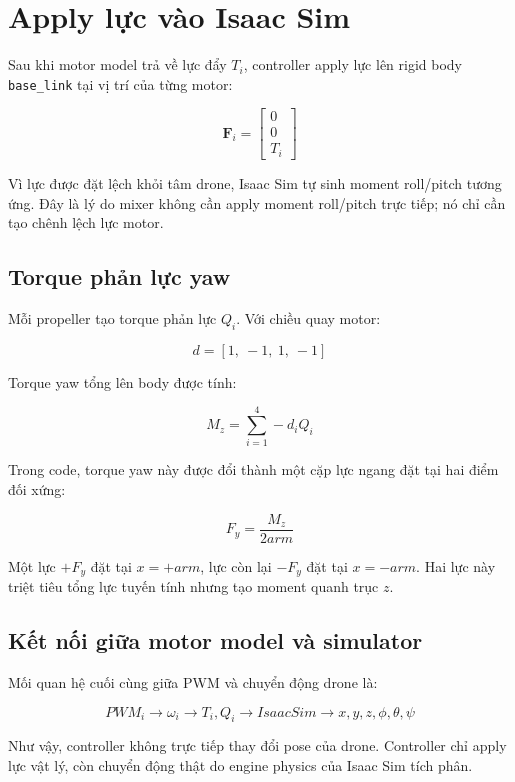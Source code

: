 \section{Apply lực vào Isaac Sim}

Sau khi motor model trả về lực đẩy $T_i$, controller apply lực lên rigid body
\texttt{base\_link} tại vị trí của từng motor:

\begin{equation}
    \mathbf{F}_i
    =
    \begin{bmatrix}
        0 \\
        0 \\
        T_i
    \end{bmatrix}
\end{equation}

Vì lực được đặt lệch khỏi tâm drone, Isaac Sim tự sinh moment roll/pitch tương
ứng. Đây là lý do mixer không cần apply moment roll/pitch trực tiếp; nó chỉ cần
tạo chênh lệch lực motor.

\subsection{Torque phản lực yaw}

Mỗi propeller tạo torque phản lực $Q_i$. Với chiều quay motor:

\begin{equation}
    d = [1,\ -1,\ 1,\ -1]
\end{equation}

Torque yaw tổng lên body được tính:

\begin{equation}
    M_z
    =
    \sum_{i=1}^{4} -d_iQ_i
\end{equation}

Trong code, torque yaw này được đổi thành một cặp lực ngang đặt tại hai điểm
đối xứng:

\begin{equation}
    F_y
    =
    \frac{M_z}{2arm}
\end{equation}

Một lực $+F_y$ đặt tại $x=+arm$, lực còn lại $-F_y$ đặt tại $x=-arm$. Hai lực
này triệt tiêu tổng lực tuyến tính nhưng tạo moment quanh trục $z$.

\subsection{Kết nối giữa motor model và simulator}

Mối quan hệ cuối cùng giữa PWM và chuyển động drone là:

\begin{equation}
    PWM_i
    \longrightarrow
    \omega_i
    \longrightarrow
    T_i,Q_i
    \longrightarrow
    IsaacSim
    \longrightarrow
    x,y,z,\phi,\theta,\psi
\end{equation}

Như vậy, controller không trực tiếp thay đổi pose của drone. Controller chỉ
apply lực vật lý, còn chuyển động thật do engine physics của Isaac Sim tích
phân.
